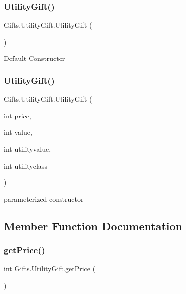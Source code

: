 \subsubsection{\texorpdfstring{Utility\+Gift()}{UtilityGift()}\hspace{0.1cm}{\footnotesize\ttfamily [1/2]}}
{\footnotesize\ttfamily Gifts.\+Utility\+Gift.\+Utility\+Gift (\begin{DoxyParamCaption}{ }\end{DoxyParamCaption})\hspace{0.3cm}{\ttfamily [inline]}}

Default Constructor \mbox{\label{class_gifts_1_1_utility_gift_a4d1c14acee3c207b6c02b025f80e832d}} 
\subsubsection{\texorpdfstring{Utility\+Gift()}{UtilityGift()}\hspace{0.1cm}{\footnotesize\ttfamily [2/2]}}
{\footnotesize\ttfamily Gifts.\+Utility\+Gift.\+Utility\+Gift (\begin{DoxyParamCaption}\item[{int}]{price,  }\item[{int}]{value,  }\item[{int}]{utilityvalue,  }\item[{int}]{utilityclass }\end{DoxyParamCaption})\hspace{0.3cm}{\ttfamily [inline]}}

parameterized constructor 

\subsection{Member Function Documentation}
\mbox{\label{class_gifts_1_1_utility_gift_aa4bd57a0e827ad92023a5651d3690b06}} 
\subsubsection{\texorpdfstring{get\+Price()}{getPrice()}}
{\footnotesize\ttfamily int Gifts.\+Utility\+Gift.\+get\+Price (\begin{DoxyParamCaption}{ }\end{DoxyParamCaption})\hspace{0.3cm}{\ttfamily [inline]}}

